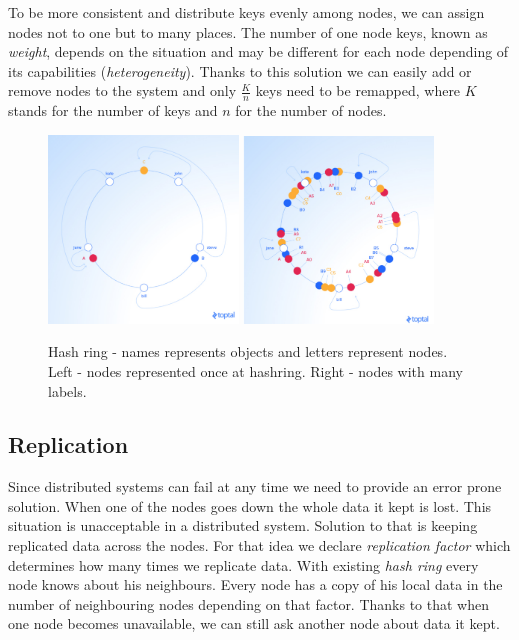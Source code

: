         To be more consistent and distribute keys evenly among nodes, we can assign nodes not to one but to many places.
        The number of one node keys, known as \textit{weight}, depends on the situation and may be different for each node depending of its capabilities (\textit{heterogeneity}). 
        Thanks to this solution we can easily add or remove nodes to the system and only $\frac{K}{n}$ keys need to be remapped, where $K$ stands for the number of keys and $n$ for the number of nodes.
        
        \begin{figure}[ht]
            \centering
                \includegraphics[width=0.45\textwidth]{thesis/figures/hashring.png}  
                \includegraphics[width=0.45\textwidth]{thesis/figures/vnodes.png}
            \caption{Hash ring - names represents objects and letters represent nodes. 
                    Left - nodes represented once at hashring.
                    Right - nodes with many labels. \cite{ConsistentHashing}}
        \end{figure} %
        
    \subsection{Replication} 
        Since distributed systems can fail at any time we need to provide an error prone solution.
        When one of the nodes goes down the whole data it kept is lost.
        This situation is unacceptable in a distributed system.
        Solution to that is keeping replicated data across the nodes.
        For that idea we declare \textit{replication factor} which determines how many times we replicate data.
        With existing \textit{hash ring} every node knows about his neighbours.
        Every node has a copy of his local data in the number of neighbouring nodes depending on that factor.
        Thanks to that when one node becomes unavailable, we can still ask another node about data it kept.
        
